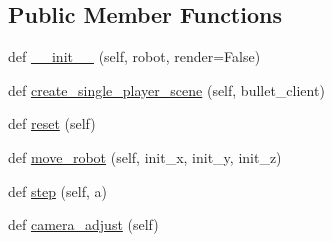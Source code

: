 \subsection*{Public Member Functions}
\begin{DoxyCompactItemize}
\item 
def \hyperlink{classpybullet-gym_1_1pybulletgym_1_1envs_1_1mujoco_1_1envs_1_1locomotion_1_1walker__base__env_1_1_walker_base_mu_jo_co_env_a8f2cf513687af04b59a56c30c8b9c26e}{\+\_\+\+\_\+init\+\_\+\+\_\+} (self, robot, render=False)
\item 
def \hyperlink{classpybullet-gym_1_1pybulletgym_1_1envs_1_1mujoco_1_1envs_1_1locomotion_1_1walker__base__env_1_1_walker_base_mu_jo_co_env_af76a51f02f655b128502525cb6819be6}{create\+\_\+single\+\_\+player\+\_\+scene} (self, bullet\+\_\+client)
\item 
def \hyperlink{classpybullet-gym_1_1pybulletgym_1_1envs_1_1mujoco_1_1envs_1_1locomotion_1_1walker__base__env_1_1_walker_base_mu_jo_co_env_adc8db22e87a072145ecc51b7a6abee82}{reset} (self)
\item 
def \hyperlink{classpybullet-gym_1_1pybulletgym_1_1envs_1_1mujoco_1_1envs_1_1locomotion_1_1walker__base__env_1_1_walker_base_mu_jo_co_env_ae820d4ea4b3da6cbfd779f7fd655525e}{move\+\_\+robot} (self, init\+\_\+x, init\+\_\+y, init\+\_\+z)
\item 
def \hyperlink{classpybullet-gym_1_1pybulletgym_1_1envs_1_1mujoco_1_1envs_1_1locomotion_1_1walker__base__env_1_1_walker_base_mu_jo_co_env_a878089f92c3805e135cfe431156e2248}{step} (self, a)
\item 
def \hyperlink{classpybullet-gym_1_1pybulletgym_1_1envs_1_1mujoco_1_1envs_1_1locomotion_1_1walker__base__env_1_1_walker_base_mu_jo_co_env_ae5bda20f4f14a06f842e8473d1bd5416}{camera\+\_\+adjust} (self)
\end{DoxyCompactItemize}
